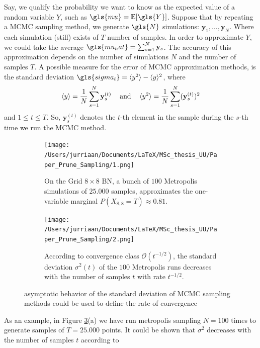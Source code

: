 \documentclass[a4paper, twoside, 11pt]{report}
\theoremstyle{plain}
\theoremstyle{definition}
\theoremstyle{remark}
\newcommand{\E}{{\mathbb E}}
\newcommand{\bfy}{{\mathbf{y}}}
\begin{document}
Say, we qualify the probability we want to know as the expected value of a random variable $Y$, such as $\gls{mu} = \E[\gls{Y}]$. Suppose that by repeating a MCMC sampling method, we generate $\gls{N}$ simulations: $\bfy_1, \ldots , \bfy_N$. Where each simulation (still) exists of $T$ number of samples. In order to approximate $Y$, we could take the average $\gls{mu_hat} = \sum_{s=1}^N \bfy_s$. The accuracy of this approximation depends on the number of simulations $N$ and the number of samples $T$. A possible measure for the error of MCMC approximation methods, is the standard deviation $\gls{sigma_t} = \langle y^2 \rangle - \langle y \rangle ^2$, where
\begin{align*}
\centering
\langle y \rangle = \frac{1}{N} \sum_{s=1}^N \bfy_s^{(t)} \hspace{1pc} \text{and} \hspace{1pc}  \langle y^2 \rangle = \frac{1}{N} \sum_{s=1}^N (\bfy_s^{(t)})^2
\end{align*}
and $1 \leq t \leq T$. So, $\bfy_s^{(t)}$ denotes the $t$-th element in the sample during the $s$-th time we run the MCMC method. 
\begin{figure}[H]
\centering
\begin{subfigure}[t]{0.5\textwidth}
  \centering
  \captionsetup{width = 0.9\textwidth}
  \texttt{[image: /Users/jurriaan/Documents/LaTeX/MSc\_thesis\_UU/Paper\_Prune\_Sampling/1.png]}
  \caption{On the Grid $8 \times 8$ BN, a bunch of $100$ Metropolis simulations of $25.000$ samples, approximates the one-variable marginal $P(X_{8,8} = T) \approx 0.81$.}
  \label{sub_1a}
\end{subfigure}%
\begin{subfigure}[t]{0.5\textwidth}
  \centering
  \captionsetup{width = 0.9\textwidth}
  \texttt{[image: /Users/jurriaan/Documents/LaTeX/MSc\_thesis\_UU/Paper\_Prune\_Sampling/2.png]}
  \caption{According to convergence class $\mathcal{O}(t^{-1/2})$, the standard deviation ${\sigma}^2(t)$ of the $100$ Metropolis runs decreases with the number of samples $t$ with rate $t^{-1/2}$.}
  \label{sub_1b}
\end{subfigure}
\caption{asymptotic behavior of the standard deviation of MCMC sampling methods could be used to define the rate of convergence}
\label{fig1}
\end{figure}
As an example, in Figure \ref{fig1}(a) we have run metropolis sampling $N=100$ times to generate samples of $T=25.000$ points. It could be shown \cite{owen2013monte} that $\sigma^2$ decreases with the number of samples $t$ according to
\end{document}
